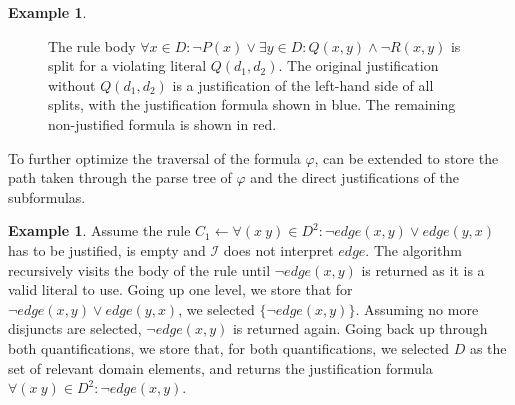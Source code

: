 \documentclass[11pt]{article}
\newcommand{\m}[1]{\ensuremath{#1}\xspace}
\newcommand{\lrule}{\m{\leftarrow}}
\newcommand{\I}{\m{\mathcal{I}}}
\newcommand{\f}{\m{\varphi}}
\newcommand{\typed}[2]{\m{#1\in #2:}}
\theoremstyle{plain}
\theoremstyle{definition}
\theoremstyle{example_basic}
\newtheorem{example}[thm]{Example}
\theoremstyle{example_contd}
\theoremstyle{plain}
\newcommand{\change}[1]{#1}
\begin{document}
\begin{example}
\begin{figure}
\centering
{}
\caption{The rule body $\forall \typed{x}{D} \lnot P(x) \lor \exists \typed{y}{D} Q(x,y) \land \lnot R(x,y)$ is split for a violating literal $Q(d_1,d_2)$. The original justification without $Q(d_1,d_2)$ is a justification of the left-hand side of all splits, with the justification formula shown in blue. The remaining non-justified formula is shown in red.
}
\label{fig:split}
\end{figure}


\end{example}

\change{To further optimize the traversal of the formula \f,
\buildconstr can be extended to store the path taken through the parse
tree of \f and the direct justifications of the subformulas.}

\begin{example}
Assume the rule $C_1 \lrule \forall \typed{(x~y)}{D^2} \lnot edge(x,y) \lor
edge(y,x)$ has to be justified, \jgraph is empty and \I does not
interpret $edge$. The  \buildconstr algorithm recursively visits the body of the rule
until $\lnot edge(x,y)$ is returned as it is a valid
literal to use. Going up one level, we store that for $\lnot edge(x,y) \lor
edge(y,x)$, we selected $\{\lnot edge(x,y)\}$. Assuming no more disjuncts
are selected, $\lnot edge(x,y)$ is returned again. Going back up through
both quantifications, we store that, for both quantifications, we selected
$D$ as the set of relevant domain elements, and \buildconstr returns the
justification formula 
$\forall \typed{(x~y)}{D^2} \lnot edge(x,y)$.
\end{example}
\end{document}
